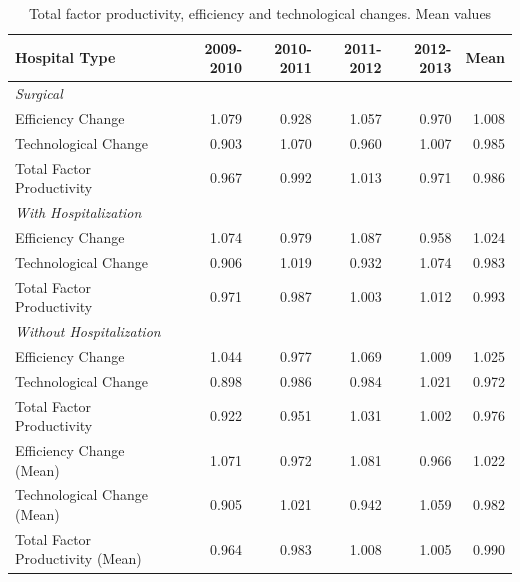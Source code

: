 \documentclass[11pt,a4paper,oneside]{article}
\begin{document}
\begin{table}[htbp]
  \centering
  \caption{Total factor productivity, efficiency and technological changes. Mean values}
    \begin{tabular}{lrrrrr}
    \toprule
    Hospital Type & 2009-2010 & 2010-2011 & 2011-2012 & 2012-2013 & Mean \\
    \midrule
    \textit{Surgical} &       &       &       &       &  \\
\cmidrule(r){2-6}
    Efficiency Change & 1.079 & 0.928 & 1.057 & 0.970 & 1.008 \\
    Technological Change & 0.903 & 1.070 & 0.960 & 1.007 & 0.985 \\
    Total Factor Productivity & 0.967 & 0.992 & 1.013 & 0.971 & 0.986 \\
    \midrule
    \textit{With Hospitalization} &       &       &       &       &  \\
\cmidrule(r){2-6}
    Efficiency Change & 1.074 & 0.979 & 1.087 & 0.958 & 1.024 \\
    Technological Change & 0.906 & 1.019 & 0.932 & 1.074 & 0.983 \\
    Total Factor Productivity & 0.971 & 0.987 & 1.003 & 1.012 & 0.993 \\
    \midrule
    \textit{Without Hospitalization} &       &       &       &       &  \\
\cmidrule(r){2-6}
    Efficiency Change & 1.044 & 0.977 & 1.069 & 1.009 & 1.025 \\
    Technological Change & 0.898 & 0.986 & 0.984 & 1.021 & 0.972 \\
    Total Factor Productivity & 0.922 & 0.951 & 1.031 & 1.002 & 0.976 \\
    \midrule
    Efficiency  Change (Mean) & 1.071 & 0.972 & 1.081 & 0.966 & 1.022 \\
    Technological Change (Mean) & 0.905 & 1.021 & 0.942 & 1.059 & 0.982 \\
    Total Factor Productivity (Mean) & 0.964 & 0.983 & 1.008 & 1.005 & 0.990 \\
    \bottomrule
    \end{tabular}
  \label{tab:TFP}
\end{table}

\vspace*{\fill}



\vspace*{\fill}
\end{document}
